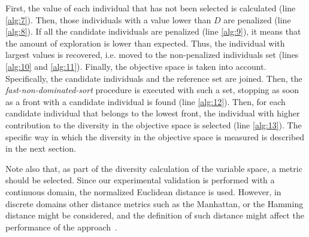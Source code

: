 %
First, the \DCN{} value of each individual that has not been selected is calculated (line \ref{alg:7}).
%
Then, those individuals with a \DCN{} value lower than $D$ are penalized (line \ref{alg:8}).
%
If all the candidate individuals are penalized (line \ref{alg:9}), it means that the amount of exploration is lower than expected.
%
Thus, the individual with largest \DCN{} values is recovered, i.e. moved to the non-penalized individuals set (lines \ref{alg:10} and \ref{alg:11}).
%
Finally, the objective space is taken into account.
%
Specifically, the candidate individuals and the reference set are joined.
%
Then, the \textit{fast-non-dominated-sort} procedure is executed with such a set, stopping as soon as a front with a candidate individual is found (line \ref{alg:12}).
%
Then, for each candidate individual that belongs to the lowest front, the individual with higher contribution to the diversity in the objective space is selected (line \ref{alg:13}).
%
The specific way in which the diversity in the objective space is measured is described in the next section.
%
%
%

Note also that, as part of the diversity calculation of the variable space, a metric should be selected.
%
Since our experimental validation is performed with a continuous domain, the normalized Euclidean distance is used.
%
However, in discrete domains other distance metrics such as the Manhattan, or the Hamming distance might be considered, and the definition of
such distance might affect the performance of the approach~\cite{Segura:17}.


%
%
%

%
%
%

